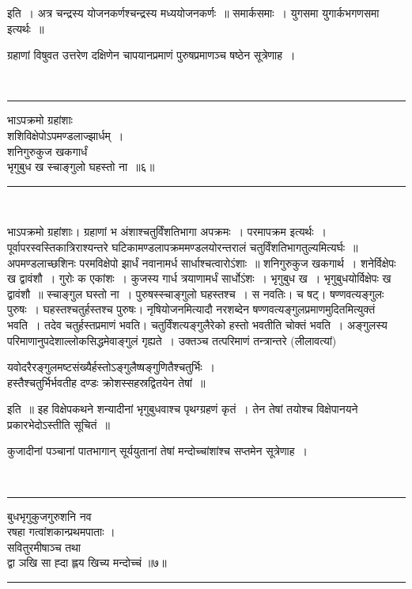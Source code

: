 \documentclass[12pt,a4paper]{report}
\newenvironment{moola}
{
~\\
\hrule
\begin{center}
\begin{LARGE}
}
{
\end{LARGE}
\end{center}
\hrule
~\\
}
\begin{document}
इति~। अत्र चन्द्रस्य योजनकर्णश्चन्द्रस्य मध्ययोजनकर्णः~॥ समार्कसमाः~। युगसमा युगार्कभगणसमा इत्यर्थः~॥ 

ग्रहाणां विषुवत उत्तरेण दक्षिणेन चापयानप्रमाणं पुरुषप्रमाणञ्च षष्ठेन सूत्रेणाह~।

\begin{moola}
 भाऽपक्रमो ग्रहांशाः \\
 शशिविक्षेपोऽपमण्डलाज्झार्धम्~। \\
शनिगुरुकुज खकगार्धं \\
भृगुबुध ख स्चाङ्गुलो घहस्तो ना~॥६॥
\end{moola}

भाऽपक्रमो ग्रहांशाः। ग्रहाणां भ अंशाश्चतुर्विंशतिभागा अपक्रमः~। परमापक्रम इत्यर्थः~। पूर्वापरस्वस्तिकात्रिराश्यन्तरे घटिकामण्डलापक्रममण्डलयोरन्तरालं
चतुर्विंशतिभागतुल्यमित्यर्घः~॥ अपमण्डलाच्छशिनः परमविक्षेपो झार्धं नवानामर्ध सार्धाश्चत्वारोऽंशाः~॥ शनिगुरुकुज खकगार्थ~। शनेर्विक्षेपः ख द्वावंशौ~।
गुरोः क एकांशः~। कुजस्य गार्ध त्रयाणामर्धं सार्धोऽंशः~। भृगुबुध ख~। भृगुबुधयोर्विक्षेपः ख द्वावंशौ~॥ स्चाङ्गुल घस्तो ना~। पुरुषस्स्चाङ्गुलो घहस्तश्च~।
स नवतिः। च षट्। षण्णवत्यङ्गुलः पुरुषः~। घहस्तश्चतुर्हस्तश्च पुरुषः। नृषियोजनमित्यादौ नरशब्देन षण्णवत्यङ्गुलप्रमाणमुदितमित्युक्तं भवति~। तदेव
चतुर्हस्तप्रमाणं भवति। चतुर्विंशत्यङ्गुलैरेको हस्तो भवतीति चोक्तं भवति~। अङ्गुलस्य परिमाणानुपदेशाल्लोकसिद्धमेवाङ्गुलं गृह्यते~। उक्तञ्च तत्परिमाणं
तन्त्रान्तरे (लीलावत्यां)

\begin{center}
 \begin{large}
यवोदरैरङ्गुलमष्टसंख्यैर्हस्तोऽङ्गुलैष्षङ्गुणितैश्चतुर्भिः~। \\
हस्तैश्चतुर्भिर्भवतीह दण्डः क्रोशस्सहस्रद्वितयेन तेषां~॥
\end{large}
\end{center}

इति~॥ इह विक्षेपकथने शन्यादीनां भृगुबुधवाश्च पृथग्ग्रहणं कृतं~। तेन तेषां तयोश्च विक्षेपानयने प्रकारभेदोऽस्तीति सूचितं~॥ 

कुजादीनां पञ्चानां पातभागान् सूर्ययुतानां तेषां मन्दोच्चांशांश्च सप्तमेन सूत्रेणाह~।

\begin{moola}
बुधभृगुकुजगुरुशनि नव \\
रषहा गत्वांशकान्प्रथमपाताः । \\
सवितुरमीषाञ्च तथा \\
द्वा ञखि सा ह्दा ह्लय खिच्य मन्दोच्चं ॥७॥ 
\end{moola}
\end{document}

